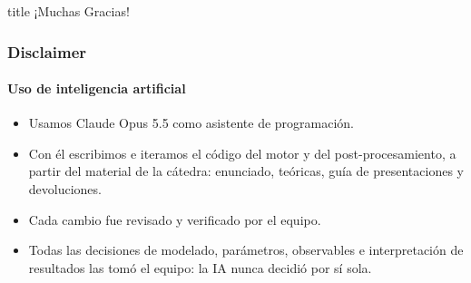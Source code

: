 \documentclass[11pt,aspectratio=169]{beamer}
\newenvironment{cuerpo}[1][0.88\textwidth]{%
  \par\vspace{0.2em}\begin{center}\begin{minipage}{#1}}%
  {\end{minipage}\end{center}}
\newcommand{\cajatitulo}[1]{%
  \begin{center}%
  \begin{minipage}{0.84\textwidth}%
    \begin{beamercolorbox}[wd=\linewidth,sep=14pt,center]{title}
      \usebeamerfont{title}#1
    \end{beamercolorbox}%
  \end{minipage}%
  \end{center}}
\begin{document}
\begin{frame}
  \vfill
  \cajatitulo{¡Muchas Gracias!}
  \vfill
\end{frame}

\begin{frame}
  \frametitle{Disclaimer}
  \framesubtitle{Uso de inteligencia artificial}

  \vfill
  \begin{cuerpo}[0.84\textwidth]
    \begin{itemize}\setlength{\itemsep}{0.8em}
      \item Usamos Claude Opus 5.5 como asistente de programación.
      \item Con él escribimos e iteramos el código del motor y del
            post-procesamiento, a partir del material de la cátedra:
            enunciado, teóricas, guía de presentaciones y devoluciones.
      \item Cada cambio fue revisado y verificado por el equipo.
      \item Todas las decisiones de modelado, parámetros, observables e
            interpretación de resultados las tomó el equipo: la IA nunca
            decidió por sí sola.
    \end{itemize}
  \end{cuerpo}
  \vfill
\end{frame}
\end{document}
